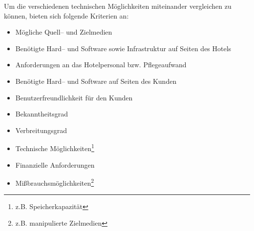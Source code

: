 Um die verschiedenen technischen Möglichkeiten miteinander vergleichen zu können, bieten sich folgende Kriterien an:

\begin{itemize}
\item Mögliche Quell– und Zielmedien
\item Benötigte Hard-- und Software sowie Infrastruktur auf Seiten des Hotels
\item Anforderungen an das Hotelpersonal bzw. Pflegeaufwand
\item Benötigte Hard-- und Software auf Seiten des Kunden
\item Benutzerfreundlichkeit für den Kunden
\item Bekanntheitsgrad 
\item Verbreitungsgrad 
\item Technische Möglichkeiten\footnote{z.B. Speicherkapazität}
\item Finanzielle Anforderungen
\item Mißbrauchsmöglichkeiten\footnote{z.B. manipulierte Zielmedien}
\end{itemize}


